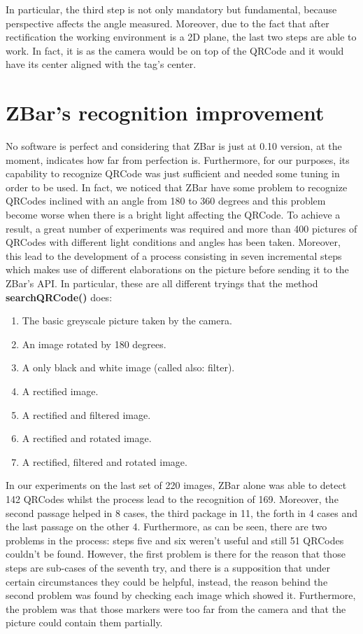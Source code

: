 In particular, the third step is not only mandatory but fundamental, because perspective affects the angle measured. Moreover, due to the fact that after rectification the working environment is a 2D plane, the last two steps are able to work. In fact, it is as the camera would be on top of the QRCode and it would have its center aligned with the tag's center.

\section{ZBar's recognition improvement} 
No software is perfect and considering that ZBar is just at 0.10 version, at the moment, indicates how far from perfection is. Furthermore, for our purposes, its capability to recognize QRCode was just sufficient and needed some tuning in order to be used. In fact, we noticed that ZBar have some problem to recognize QRCodes inclined with an angle from 180 to 360 degrees and this problem become worse when there is a bright light affecting the QRCode. To achieve a result, a great number of experiments was required and more than 400 pictures of QRCodes with different light conditions and angles has been taken. Moreover, this lead to the development of a process consisting in seven incremental steps which makes use of different elaborations on the picture before sending it to the ZBar's API.
In particular, these are all different tryings that the method \textbf{searchQRCode()} does:

\begin{enumerate}
	\item The basic greyscale picture taken by the camera.
	\item An image rotated by 180 degrees.
	\item A only black and white image (called also: filter).
	\item A rectified image.
	\item A rectified and filtered image.
	\item A rectified and rotated image.
	\item A rectified, filtered and rotated image.
\end{enumerate}

In our experiments on the last set of 220 images, ZBar alone was able to detect 142 QRCodes whilst the process lead to the recognition of 169. Moreover, the second passage helped in 8 cases, the third package in 11, the forth in 4 cases and the last passage on the other 4. Furthermore, as can be seen, there are two problems in the process: steps five and six weren't useful and still 51 QRCodes couldn't be found. However, the first problem is there for the reason that those steps are sub-cases of the seventh try, and there is a supposition that under certain circumstances they could be helpful, instead, the reason behind the second problem was found by checking each image which showed it. Furthermore, the problem was that those markers were too far from the camera and that the picture could contain them partially.

